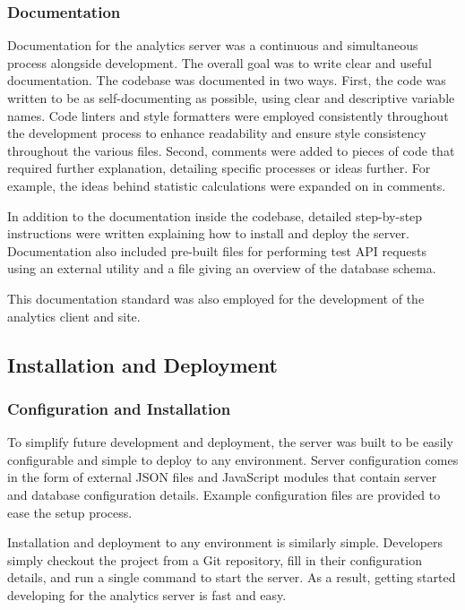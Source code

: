 \subsubsection{Documentation}

Documentation for the analytics server was a continuous and simultaneous process alongside development. The overall goal was to write clear and useful documentation. The codebase was documented in two ways. First, the code was written to be as self-documenting as possible, using clear and descriptive variable names. Code linters and style formatters were employed consistently throughout the development process to enhance readability and ensure style consistency throughout the various files. Second, comments were added to pieces of code that required further explanation, detailing specific processes or ideas further. For example, the ideas behind statistic calculations were expanded on in comments.

In addition to the documentation inside the codebase, detailed step-by-step instructions were written explaining how to install and deploy the server. Documentation also included pre-built files for performing test API requests using an external utility and a file giving an overview of the database schema.

This documentation standard was also employed for the development of the analytics client and site.

\subsection{Installation and Deployment}

\subsubsection{Configuration and Installation}

To simplify future development and deployment, the server was built to be easily configurable and simple to deploy to any environment. Server configuration comes in the form of external JSON files and JavaScript modules that contain server and database configuration details. Example configuration files are provided to ease the setup process. 

Installation and deployment to any environment is similarly simple. Developers simply checkout the project from a Git repository, fill in their configuration details, and run a single command to start the server. As a result, getting started developing for the analytics server is fast and easy. 

